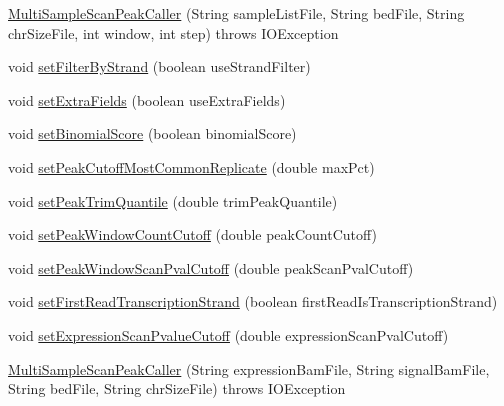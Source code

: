 \begin{DoxyCompactItemize}
\item 
\hyperlink{classbroad_1_1pda_1_1seq_1_1protection_1_1_multi_sample_scan_peak_caller_a6d6c011e7c546d363f85ac20f4ce00f7}{Multi\+Sample\+Scan\+Peak\+Caller} (String sample\+List\+File, String bed\+File, String chr\+Size\+File, int window, int step)  throws I\+O\+Exception 
\item 
void \hyperlink{classbroad_1_1pda_1_1seq_1_1protection_1_1_multi_sample_scan_peak_caller_a74e4548bd7887800f29fc5d487ccd37d}{set\+Filter\+By\+Strand} (boolean use\+Strand\+Filter)
\item 
void \hyperlink{classbroad_1_1pda_1_1seq_1_1protection_1_1_multi_sample_scan_peak_caller_a6af45a42068025dc80837e1df7dbcd49}{set\+Extra\+Fields} (boolean use\+Extra\+Fields)
\item 
void \hyperlink{classbroad_1_1pda_1_1seq_1_1protection_1_1_multi_sample_scan_peak_caller_a34f6efc6e8cf3e5eca8c2e42ba418f83}{set\+Binomial\+Score} (boolean binomial\+Score)
\item 
void \hyperlink{classbroad_1_1pda_1_1seq_1_1protection_1_1_multi_sample_scan_peak_caller_ae0a18e8cadb800e2f88cb720e0cbaae2}{set\+Peak\+Cutoff\+Most\+Common\+Replicate} (double max\+Pct)
\item 
void \hyperlink{classbroad_1_1pda_1_1seq_1_1protection_1_1_multi_sample_scan_peak_caller_aab4e703b4069c5eb67829cebe4b4535a}{set\+Peak\+Trim\+Quantile} (double trim\+Peak\+Quantile)
\item 
void \hyperlink{classbroad_1_1pda_1_1seq_1_1protection_1_1_multi_sample_scan_peak_caller_acb73fe5a22023758262f721784493c36}{set\+Peak\+Window\+Count\+Cutoff} (double peak\+Count\+Cutoff)
\item 
void \hyperlink{classbroad_1_1pda_1_1seq_1_1protection_1_1_multi_sample_scan_peak_caller_ae6331bb975e2d00437692308e01e868d}{set\+Peak\+Window\+Scan\+Pval\+Cutoff} (double peak\+Scan\+Pval\+Cutoff)
\item 
void \hyperlink{classbroad_1_1pda_1_1seq_1_1protection_1_1_multi_sample_scan_peak_caller_ada766545a50e40b013e0c61d72993b84}{set\+First\+Read\+Transcription\+Strand} (boolean first\+Read\+Is\+Transcription\+Strand)
\item 
void \hyperlink{classbroad_1_1pda_1_1seq_1_1protection_1_1_multi_sample_scan_peak_caller_a1801b112973b23055ad140ba906ab57a}{set\+Expression\+Scan\+Pvalue\+Cutoff} (double expression\+Scan\+Pval\+Cutoff)
\item 
\hyperlink{classbroad_1_1pda_1_1seq_1_1protection_1_1_multi_sample_scan_peak_caller_a94915d6cb05815f02a46cc66f86f4eee}{Multi\+Sample\+Scan\+Peak\+Caller} (String expression\+Bam\+File, String signal\+Bam\+File, String bed\+File, String chr\+Size\+File)  throws I\+O\+Exception 

\end{DoxyCompactItemize}

